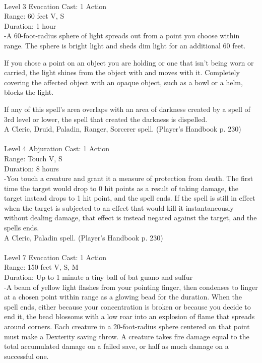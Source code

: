 \documentclass[10pt,twocolumn]{report}
\begin{document}
 \\
Level 3 \quad Evocation \quad Cast: 1 Action\\
Range: 60 feet \quad V, S\\
Duration: 1 hour \quad \\
-A 60-foot-radius sphere of light spreads out from a point you choose within range. 
The sphere is bright light and sheds dim light for an additional 60 feet. 

If you chose a point on an object you are holding or one that isn’t being worn or carried, the light shines from the object with and moves with it. Completely covering the affected object with an opaque object, such as a bowl or a helm, blocks the light. 

If any of this spell’s area overlaps with an area of darkness created by a spell of 3rd level or lower, the spell that created the darkness is dispelled.\\
A Cleric, Druid, Paladin, Ranger, Sorcerer spell. (Player's Handbook p. 230) \\


 \\
Level 4 \quad Abjuration \quad Cast: 1 Action\\
Range: Touch \quad V, S\\
Duration: 8 hours \quad \\
-You touch a creature and grant it a measure of protection from death. 
The first time the target would drop to 0 hit points as a result of taking damage, the target instead drops to 1 hit point, and the spell ends. If the spell is still in effect when the target is subjected to an effect that would kill it instantaneously without dealing damage, that effect is instead negated against the target, and the spells ends.\\
A Cleric, Paladin spell. (Player's Handbook p. 230) \\


 \\
Level 7 \quad Evocation \quad Cast: 1 Action\\
Range: 150 feet \quad V, S, M \\
Duration: Up to 1 minute \quad a tiny ball of bat guano and sulfur\\
-A beam of yellow light flashes from your pointing finger, then condenses to linger at a chosen point within range as a glowing bead for the duration. 
When the spell ends, either because your concentration is broken or because you decide to end it, the bead blossoms with a low roar into an explosion of flame that spreads around corners. Each creature in a 20-foot-radius sphere centered on that point must make a Dexterity saving throw. A creature takes fire damage equal to the total accumulated damage on a failed save, or half as much damage on a successful one. 
\end{document}
